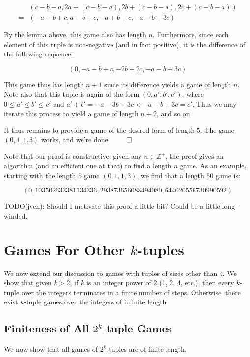 \documentclass[12pt]{amsart}
\newcommand{\zp}{\mathbb{Z}^+}
\begin{document}
$$\begin{array}{cl}
& (c - b - a, 2a + (c - b - a), 2b + (c - b - a), 2c + (c - b - a)) \\
= & (-a - b + c, a - b + c, -a + b + c, -a - b + 3c)
\end{array}$$

By the lemma above, this game also has length $n$. Furthermore, since each element of this tuple is non-negative (and in fact positive), it is the difference of the following sequence:

$$(0, -a - b + c, -2b + 2c, -a - b + 3c)$$

This game thus has length $n + 1$ since its difference yields a game of length $n$. Note also that this tuple is again of the form $(0, a', b', c')$, where $0\leq a'\leq b'\leq c'$ and $a' + b' = -a - 3b + 3c < -a - b + 3c = c'$. Thus we may iterate this process to yield a game of length $n + 2$, and so on.

It thus remains to provide a game of the desired form of length $5$. The game $(0, 1, 1, 3)$ works, and we're done. $\qed$

Note that our proof is constructive: given any $n\in \zp$, the proof gives an algorithm (and an efficient one at that) to find a length $n$ game. As an example, starting with the length $5$ game $(0, 1, 1, 3)$, we find that a length $50$ game is:

$$(0, 103502633381134336, 293873656088494080, 644020556730990592)$$

TODO(jven): Should I motivate this proof a little bit? Could be a little long-winded.

\section{Games For Other $k$-tuples\label{sec:othertuples}}

We now extend our discussion to games with tuples of sizes other than 4. We show that given $k > 2$, if $k$ is an integer power of $2$ (1, 2, 4, etc.), then every $k$-tuple over the integers terminates in a finite number of steps. Otherwise, there exist $k$-tuple games over the integers of infinite length.

\subsection{Finiteness of All $2^k$-tuple Games}

We now show that all games of $2^k$-tuples are of finite length.
\end{document}
